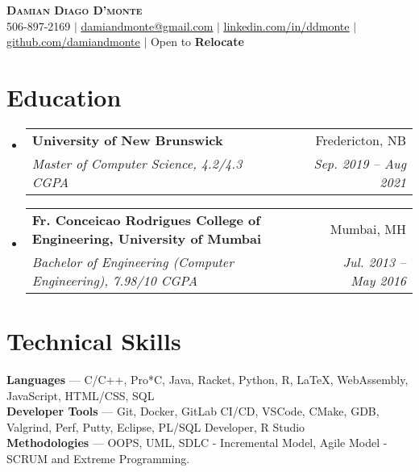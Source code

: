 \documentclass[letterpaper,10pt]{article}
\makeatletter
\newcommand{\resumeSubheading}[4]{
  \vspace{-2pt}\item
    \begin{tabular*}{0.97\textwidth}[t]{l@{\extracolsep{\fill}}r}
      \textbf{#1} & #2 \\
      \textit{\small#3} & \textit{\small #4} \\
    \end{tabular*}\vspace{-7pt}
}
\newcommand{\resumeSubHeadingListStart}{\begin{itemize}[leftmargin=0.15in, label={}]}
\newcommand{\resumeSubHeadingListEnd}{\end{itemize}}
\makeatother
\begin{document}

\begin{center}
    \textbf{\Huge \scshape Damian Diago D'monte} \\ \vspace{4pt}
    \small 506-897-2169 $|$ \href{mailto:x@x.com}{\underline{damiandmonte@gmail.com}} $|$ 
    \href{https://linkedin.com/in/ddmonte}{\underline{linkedin.com/in/ddmonte}} $|$
    \href{https://github.com/damiandmonte}{\underline{github.com/damiandmonte}} $|$
    \small Open to \textbf{Relocate}
\end{center}


\section{Education}
  \resumeSubHeadingListStart
    \resumeSubheading
      {University of New Brunswick}{Fredericton, NB}
      {Master of Computer Science, 4.2/4.3 CGPA}{Sep. 2019 -- Aug 2021}
    \resumeSubheading
      {Fr. Conceicao Rodrigues College of Engineering, University of Mumbai}{Mumbai, MH}
      {Bachelor of Engineering (Computer Engineering), 7.98/10 CGPA }{Jul. 2013 -- May 2016}
  \resumeSubHeadingListEnd


%
\section{Technical Skills}
 \begin{itemize}[leftmargin=0.15in, label={}]
    \small{\item{
     \textbf{Languages}{ --- C/C++, Pro*C, Java, Racket, Python, R, \LaTeX{}, WebAssembly, JavaScript, HTML/CSS, SQL} \\
     \textbf{Developer Tools}{ --- Git, Docker, GitLab CI/CD, VSCode, CMake, GDB, Valgrind, Perf, Putty, Eclipse, PL/SQL Developer, R Studio} \\
     \textbf{Methodologies}{ --- OOPS, UML, SDLC - Incremental Model, Agile Model - SCRUM and Extreme Programming.}
    }}
 \end{itemize}
\end{document}

